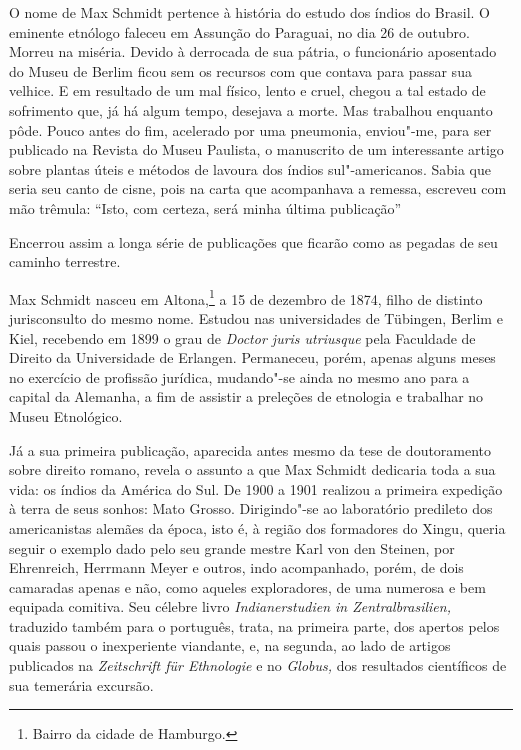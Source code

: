 O nome de Max Schmidt pertence à história do estudo dos índios do
Brasil. O eminente etnólogo faleceu em Assunção do Paraguai, no dia 26
de outubro. Morreu na miséria. Devido à derrocada de sua pátria, o
funcionário aposentado do Museu de Berlim ficou sem os recursos com que
contava para passar sua velhice. E em resultado de um mal físico, lento
e cruel, chegou a tal estado de sofrimento que, já há algum tempo,
desejava a morte. Mas trabalhou enquanto pôde. Pouco antes do fim,
acelerado por uma pneumonia, enviou"-me, para ser publicado na Revista
do Museu Paulista, o manuscrito de um interessante artigo sobre plantas
úteis e métodos de lavoura dos índios sul"-americanos. Sabia que seria
seu canto de cisne, pois na carta que acompanhava a remessa, escreveu
com mão trêmula: ``Isto, com certeza, será minha última publicação''%

Encerrou assim a longa série de publicações que ficarão como as pegadas
de seu caminho terrestre.

{Max Schmidt nasceu em Altona,\footnote{Bairro da cidade de Hamburgo.} a
15 de dezembro de 1874, filho de distinto jurisconsulto do mesmo nome.
Estudou nas universidades de Tübingen, Berlim e Kiel, recebendo em 1899
o grau de \textit{Doctor juris utriusque} pela Faculdade de Direito da
Universidade de Erlangen. Permaneceu, porém, apenas alguns meses no
exercício de profissão jurídica, mudando"-se ainda no mesmo ano para a
capital da Alemanha, a fim de assistir a preleções de etnologia e
trabalhar no Museu Etnológico.}

Já a sua primeira publicação, aparecida antes mesmo da tese de
doutoramento sobre direito romano, revela o assunto a que Max Schmidt
dedicaria toda a sua vida: os índios da América do Sul. De 1900 a 1901
realizou a primeira expedição à terra de seus sonhos: Mato Grosso.
Dirigindo"-se ao laboratório predileto dos americanistas alemães da
época, isto é, à região dos formadores do Xingu, queria seguir o exemplo
dado pelo seu grande mestre Karl von den Steinen, por Ehrenreich,
Herrmann Meyer e outros, indo acompanhado, porém, de dois camaradas
apenas e não, como aqueles exploradores, de uma numerosa e bem equipada
comitiva. Seu célebre livro \textit{Indianerstudien in Zentralbrasilien,}
traduzido também para o português, trata, na primeira parte, dos apertos
pelos quais passou o inexperiente viandante, e, na segunda, ao lado de
artigos publicados na \textit{Zeitschrift für Ethnologie} e no
\textit{Globus,} dos resultados científicos de sua temerária excursão.

